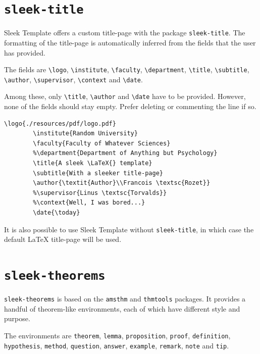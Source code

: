\documentclass[a4paper, 12pt]{report}
\def\tbs{\textbackslash}
\begin{document}
    \newpage

    \section{\texttt{sleek-title}}

    Sleek Template offers a custom title-page with the package \texttt{sleek-title}. The formatting of the title-page is automatically inferred from the fields that the user has provided.

    The fields are \texttt{\tbs{}logo}, \texttt{\tbs{}institute}, \texttt{\tbs{}faculty}, \texttt{\tbs{}department}, \texttt{\tbs{}title}, \texttt{\tbs{}subtitle}, \texttt{\tbs{}author}, \texttt{\tbs{}supervisor}, \texttt{\tbs{}context} and \texttt{\tbs{}date}.

    Among these, only \texttt{\tbs{}title}, \texttt{\tbs{}author} and \texttt{\tbs{}date} have to be provided. However, none of the fields should stay empty. Prefer deleting or commenting the line if so.

    \begin{lstlisting}[style=latexFrameTB, caption={Example of \texttt{sleek-title} title-page definition.}, gobble=8]
        \logo{./resources/pdf/logo.pdf}
        \institute{Random University}
        \faculty{Faculty of Whatever Sciences}
        %\department{Department of Anything but Psychology}
        \title{A sleek \LaTeX{} template}
        \subtitle{With a sleeker title-page}
        \author{\textit{Author}\\Francois \textsc{Rozet}}
        %\supervisor{Linus \textsc{Torvalds}}
        %\context{Well, I was bored...}
        \date{\today}
    \end{lstlisting}

    It is also possible to use Sleek Template without \texttt{sleek-title}, in which case the default \LaTeX{} title-page will be used.

    \newpage

    \section{\texttt{sleek-theorems}}

    \texttt{sleek-theorems} is based on the \texttt{amsthm} and \texttt{thmtools} packages. It provides a handful of theorem-like environments, each of which have different style and purpose.

    The environments are \texttt{theorem}, \texttt{lemma}, \texttt{proposition}, \texttt{proof}, \texttt{definition}, \texttt{hypothesis}, \texttt{method}, \texttt{question}, \texttt{answer}, \texttt{example}, \texttt{remark}, \texttt{note} and \texttt{tip}.
\end{document}
